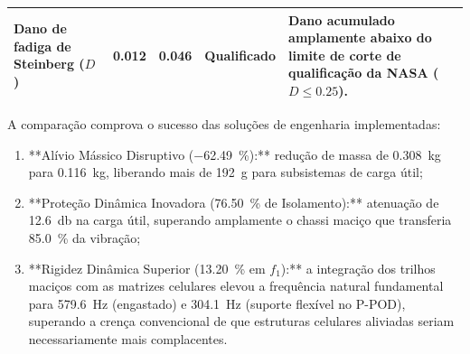 \begin{table}[htb]
\begin{tabularx}{\textwidth}{@{}>{\raggedright\arraybackslash}p{3.2cm} >{\centering\arraybackslash}p{1.8cm} >{\centering\arraybackslash}p{1.8cm} >{\centering\arraybackslash}p{2.0cm} >{\raggedright\arraybackslash}X@{}}
    Dano de fadiga de Steinberg ($D$) & \num{0.012} & \num{0.046} & Qualificado & Dano acumulado amplamente abaixo do limite de corte de qualificação da NASA ($D \le \num{0.25}$). \\
    \bottomrule
  \end{tabularx}
\end{table}

A comparação comprova o sucesso das soluções de engenharia implementadas:
\begin{enumerate}
  \item **Alívio Mássico Disruptivo (\SI{-62.49}{\percent}):** redução de massa de \SI{0.308}{\kilo\gram} para \SI{0.116}{\kilo\gram}, liberando mais de \SI{192}{\gram} para subsistemas de carga útil;
  \item **Proteção Dinâmica Inovadora (\SI{76.50}{\percent} de Isolamento):** atenuação de \SI{12.6}{\decibel} na carga útil, superando amplamente o chassi maciço que transferia \SI{85.0}{\percent} da vibração;
  \item **Rigidez Dinâmica Superior (\SI{+13.20}{\percent} em $f_1$):** a integração dos trilhos maciços com as matrizes celulares elevou a frequência natural fundamental para \SI{579.6}{\hertz} (engastado) e \SI{304.1}{\hertz} (suporte flexível no P-POD), superando a crença convencional de que estruturas celulares aliviadas seriam necessariamente mais complacentes.
\end{enumerate}
